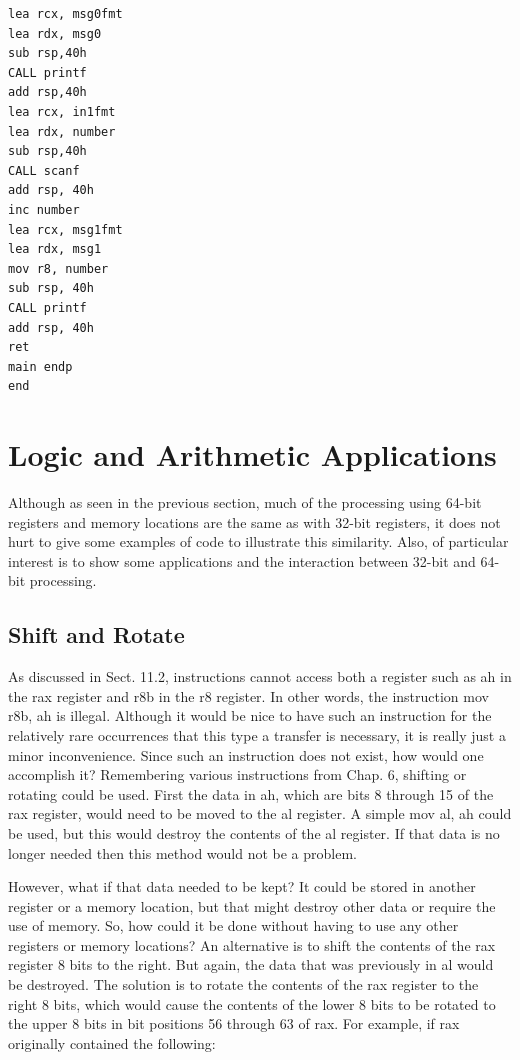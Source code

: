 \documentclass[10pt]{book}
\begin{document}
\begin{verbatim}
lea rcx, msg0fmt
lea rdx, msg0
sub rsp,40h
CALL printf
add rsp,40h
lea rcx, in1fmt
lea rdx, number
sub rsp,40h
CALL scanf
add rsp, 40h
inc number
lea rcx, msg1fmt
lea rdx, msg1
mov r8, number
sub rsp, 40h
CALL printf
add rsp, 40h
ret
main endp
end
\end{verbatim}

\section{Logic and Arithmetic Applications}
Although as seen in the previous section, much of the processing using 64-bit registers and memory locations are the same as with 32-bit registers, it does not hurt to give some examples of code to illustrate this similarity. Also, of particular interest is to show some applications and the interaction between 32-bit and 64-bit processing.

\subsection{Shift and Rotate}
As discussed in Sect. 11.2, instructions cannot access both a register such as ah in the rax register and r8b in the r8 register. In other words, the instruction mov r8b, ah is illegal. Although it would be nice to have such an instruction for the\\
relatively rare occurrences that this type a transfer is necessary, it is really just a minor inconvenience. Since such an instruction does not exist, how would one accomplish it? Remembering various instructions from Chap. 6, shifting or rotating could be used. First the data in ah, which are bits 8 through 15 of the rax register, would need to be moved to the al register. A simple mov al, ah could be used, but this would destroy the contents of the al register. If that data is no longer needed then this method would not be a problem.

However, what if that data needed to be kept? It could be stored in another register or a memory location, but that might destroy other data or require the use of memory. So, how could it be done without having to use any other registers or memory locations? An alternative is to shift the contents of the rax register 8 bits to the right. But again, the data that was previously in al would be destroyed. The solution is to rotate the contents of the rax register to the right 8 bits, which would cause the contents of the lower 8 bits to be rotated to the upper 8 bits in bit positions 56 through 63 of rax. For example, if rax originally contained the following:
\end{document}
